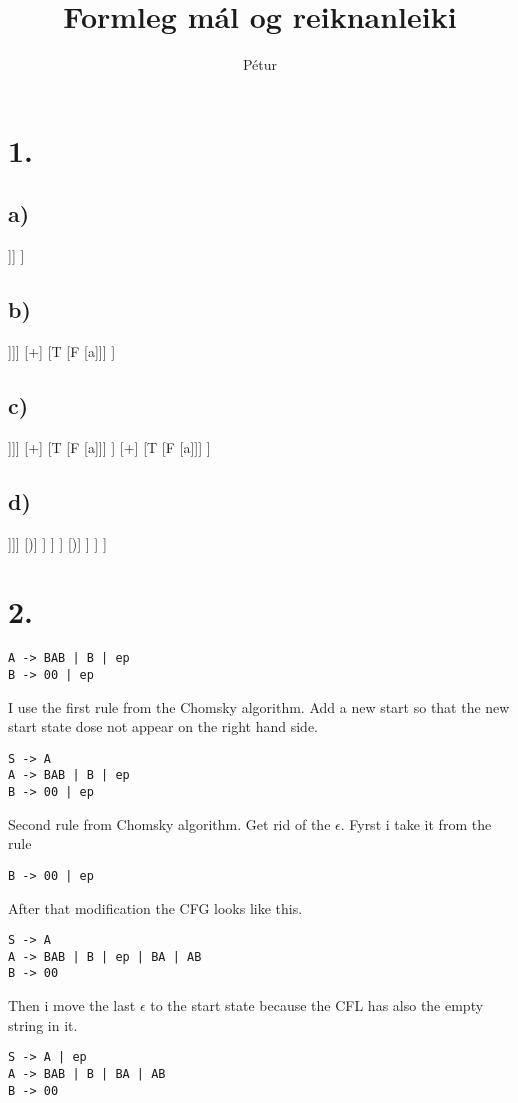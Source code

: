 \documentclass[]{article}
\begin{document}
\title{Formleg mál og reiknanleiki}
\author{Pétur}
\maketitle

\section*{1.}

\subsection*{a)}

\begin{forest}
[E
	[T [F [ a]]]
]
\end{forest}
\subsection*{b)}
\begin{forest}
[E
	[E [T [F [a]]]]
	[+]
	[T [F [a]]]
]
\end{forest}

\subsection*{c)}
\begin{forest}
[E
	[E
		[E [T [F [a]]]]
		[+]
		[T [F [a]]]	
	]
	[+]
	[T [F [a]]]
]
\end{forest}

\subsection*{d)}
\begin{forest}
[E
	[T 	
		[F
			[(]
			[E 
				[T 
					[F
						[(]
						[E [T [F [a]]]]
						[)]					
					]
				]
			]
			[)]		
		]
	]
]
\end{forest}

\section*{2.}
\begin{lstlisting}
A -> BAB | B | ep
B -> 00 | ep
\end{lstlisting}
I use the first rule from the Chomsky algorithm. Add a new start so that the new start state dose not appear on the right hand side.
\begin{lstlisting}
S -> A
A -> BAB | B | ep
B -> 00 | ep
\end{lstlisting}
Second rule from Chomsky algorithm. Get rid of the $\epsilon$. Fyrst i take it from the rule
\begin{lstlisting}
B -> 00 | ep
\end{lstlisting}
After that modification the CFG looks like this.
\begin{lstlisting}
S -> A
A -> BAB | B | ep | BA | AB
B -> 00 
\end{lstlisting}
Then i move the last $\epsilon$ to the start state because the CFL has also the empty string in it.
\begin{lstlisting}
S -> A | ep
A -> BAB | B | BA | AB
B -> 00 
\end{lstlisting}
\end{document}
